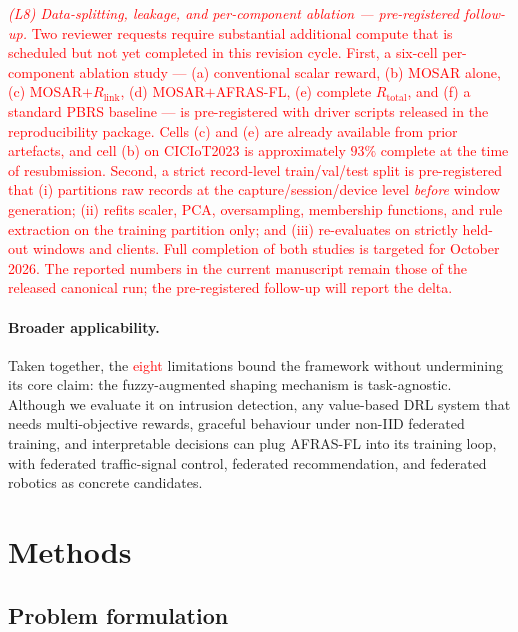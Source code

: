 \documentclass[journal]{IEEEtran}
\newcommand{\rev}[1]{\textcolor{red}{#1}}
\begin{document}
\rev{\emph{(L8) Data-splitting, leakage, and per-component ablation --- pre-registered follow-up.} Two reviewer requests require substantial additional compute that is scheduled but not yet completed in this revision cycle. First, a six-cell per-component ablation study --- (a) conventional scalar reward, (b) MOSAR alone, (c) MOSAR$+R_{\text{link}}$, (d) MOSAR$+$AFRAS-FL, (e) complete $R_{\text{total}}$, and (f) a standard PBRS baseline --- is pre-registered with driver scripts released in the reproducibility package. Cells (c) and (e) are already available from prior artefacts, and cell (b) on CICIoT2023 is approximately $93\%$ complete at the time of resubmission. Second, a strict record-level train/val/test split is pre-registered that (i) partitions raw records at the capture/session/device level \emph{before} window generation; (ii) refits scaler, PCA, oversampling, membership functions, and rule extraction on the training partition only; and (iii) re-evaluates on strictly held-out windows and clients. Full completion of both studies is targeted for October 2026. The reported numbers in the current manuscript remain those of the released canonical run; the pre-registered follow-up will report the delta.}

\paragraph{Broader applicability.}
Taken together, the \rev{eight} limitations bound the framework without
undermining its core claim: the fuzzy-augmented shaping mechanism
is task-agnostic. Although we evaluate it on intrusion detection,
any value-based DRL system that needs multi-objective rewards,
graceful behaviour under non-IID federated training, and
interpretable decisions can plug AFRAS-FL into its training loop,
with federated traffic-signal control, federated recommendation,
and federated robotics as concrete candidates.


\section{Methods}\label{sec:methods}

\subsection{Problem formulation}\label{sec:methods_problem}
\end{document}
